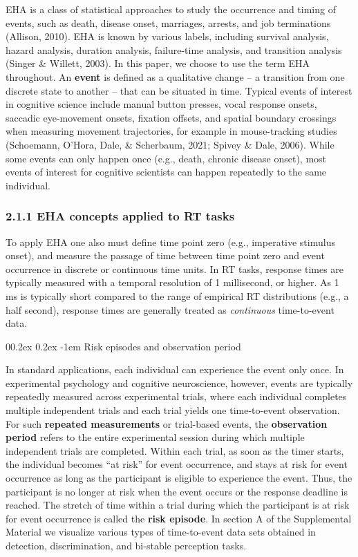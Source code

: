 \documentclass[
  english,
  man, donotrepeattitle,floatsintext]{apa6}
\makeatletter
\let\oldparagraph\paragraph
\renewcommand{\paragraph}{
    \@ifstar
      \xxxParagraphStar
      \xxxParagraphNoStar
  }
\newcommand{\xxxParagraphStar}[1]{\oldparagraph*{#1}\mbox{}}
\newcommand{\xxxParagraphNoStar}[1]{\oldparagraph{#1}\mbox{}}
\renewcommand{\paragraph}{\@startsection{paragraph}{4}{\parindent}%
  {0\baselineskip \@plus 0.2ex \@minus 0.2ex}%
  {-1em}%
  {\normalfont\normalsize\bfseries\itshape\typesectitle}}
\makeatother
\begin{document}
EHA is a class of statistical approaches to study the occurrence and timing of events, such as death, disease onset, marriages, arrests, and job terminations (Allison, 2010). EHA is known by various labels, including survival analysis, hazard analysis, duration analysis, failure-time analysis, and transition analysis (Singer \& Willett, 2003). In this paper, we choose to use the term EHA throughout. An \textbf{event} is defined as a qualitative change -- a transition from one discrete state to another -- that can be situated in time. Typical events of interest in cognitive science include manual button presses, vocal response onsets, saccadic eye-movement onsets, fixation offsets, and spatial boundary crossings when measuring movement trajectories, for example in mouse-tracking studies (Schoemann, O'Hora, Dale, \& Scherbaum, 2021; Spivey \& Dale, 2006). While some events can only happen once (e.g., death, chronic disease onset), most events of interest for cognitive scientists can happen repeatedly to the same individual.

\subsubsection{2.1.1 EHA concepts applied to RT tasks}\label{eha-concepts-applied-to-rt-tasks}

To apply EHA one also must define time point zero (e.g., imperative stimulus onset), and measure the passage of time between time point zero and event occurrence in discrete or continuous time units. In RT tasks, response times are typically measured with a temporal resolution of 1 millisecond, or higher. As 1 ms is typically short compared to the range of empirical RT distributions (e.g., a half second), response times are generally treated as \emph{continuous} time-to-event data.

\paragraph{Risk episodes and observation period}\label{risk-episodes-and-observation-period}

In standard applications, each individual can experience the event only once. In experimental psychology and cognitive neuroscience, however, events are typically repeatedly measured across experimental trials, where each individual completes multiple independent trials and each trial yields one time-to-event observation. For such \textbf{repeated measurements} or trial-based events, the \textbf{observation period} refers to the entire experimental session during which multiple independent trials are completed. Within each trial, as soon as the timer starts, the individual becomes ``at risk'' for event occurrence, and stays at risk for event occurrence as long as the participant is eligible to experience the event. Thus, the participant is no longer at risk when the event occurs or the response deadline is reached. The stretch of time within a trial during which the participant is at risk for event occurrence is called the \textbf{risk episode}. In section A of the Supplemental Material we visualize various types of time-to-event data sets obtained in detection, discrimination, and bi-stable perception tasks.
\end{document}
